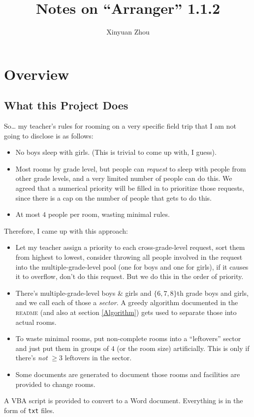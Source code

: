 \documentclass[openany,notitlepage]{book}
\makeatletter
\newcommand*{\toccontents}{\@starttoc{toc}}
\makeatother
\begin{document}
	\title{Notes on ``Arranger'' 1.1.2}
	\author{Xinyuan Zhou}
	\maketitle
	

	\toccontents
	
	\chapter{Overview}
	
	\section{What this Project Does}
	So\ldots{} my teacher's rules for rooming on a very specific field trip that I am not going to disclose is as follows:
	\begin{itemize}
		\item No boys sleep with girls. (This is trivial to come up with, I guess).
		\item Most rooms by grade level, but people can \emph{request} to sleep with people from other grade levels, and a very limited number of people can do this. We agreed that a numerical priority will be filled in to prioritize those requests, since there is a cap on the number of people that gets to do this.
		\item At most $4$ people per room, wasting minimal rules.
	\end{itemize}
	Therefore, I came up with this approach:
	\begin{itemize}
		\item Let my teacher assign a priority to each cross-grade-level request, sort them from highest to lowest, consider throwing all people involved in the request into the multiple-grade-level pool (one for boys and one for girls), if it causes it to overflow, don't do this request. But we do this in the order of priority.
		\item There's multiple-grade-level boys \& girls and $\{6,7,8\}$th grade boys and girls, and we call each of those a \emph{sector}. A greedy algorithm documented in the \textsc{readme} (and also at section \ref{Algorithm}) gets used to separate those into actual rooms.
		\item To waste minimal rooms, put non-complete rooms into a ``leftovers'' sector and just put them in groups of $4$ (or the room size) artificially. This is only if there's \emph{not} $\geq3$ leftovers in the sector.
		\item Some documents are generated to document those rooms and facilities are provided to change rooms.
	\end{itemize}
	A VBA script is provided to convert to a Word document. Everything is in the form of \verb+txt+ files.
	
\end{document}
